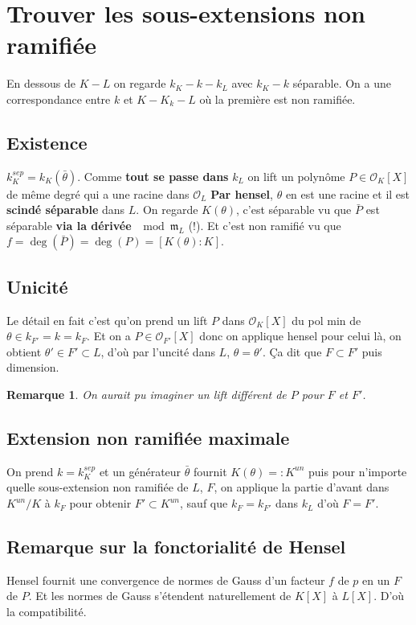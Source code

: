 \documentclass[a4paper,12pt]{book}
\newcommand{\Or}{\mathcal{O}}
\newcommand{\m}{\mathfrak m}
\theoremstyle{plain}
\newtheorem{rem}{Remarque}
\theoremstyle{definition}
\theoremstyle{remark}
\begin{document}
\section{Trouver les sous-extensions non ramifiée}
En dessous de $K-L$ on regarde $k_K-k-k_L$ avec $k_K-k$ séparable.
On a une correspondance entre $k$ et $K-K_k-L$ où la première est
non ramifiée.
\subsection{Existence}
$k_K^{sep}=k_K(\bar\theta)$. Comme \textbf{tout se passe dans} 
$k_L$ on lift un polynôme $P\in\Or_K[X]$ de même degré qui a une
racine dans $\Or_L$ \textbf{Par hensel},
$\theta$ en est une racine et il est \textbf{scindé séparable} dans
$L$. On regarde $K(\theta)$, c'est séparable vu que $\bar P$ est
séparable \textbf{via la dérivée} $\mod \m_L$ (!). Et c'est non
ramifié vu que $f=\deg(\bar P)=\deg(P)=[K(\theta):K]$.
\subsection{Unicité}
Le détail en fait c'est qu'on prend un lift $P$ dans $\Or_K[X]$ du
pol min de $\theta\in k_{F'}=k=k_F$. Et on a $P\in \Or_{F'}[X]$
donc on applique hensel pour celui là, on obtient 
$\theta'\in F'\subset L$, d'où par l'uncité dans $L$, 
$\theta=\theta'$. Ça dit que $F\subset F'$ puis dimension.

\begin{rem}
    On aurait pu imaginer un lift différent de $P$ pour $F$ et
    $F'$.
\end{rem}

\subsection{Extension non ramifiée maximale}
On prend $k=k_K^{sep}$ et un générateur $\bar \theta$ fournit
$K(\theta)=:K^{un}$ puis pour n'importe quelle sous-extension non
ramifiée de $L$, $F$, on applique la partie d'avant dans $K^{un}/K$
à $k_F$ pour obtenir $F'\subset K^{un}$, sauf que $k_F=k_{F'}$
dans $k_L$ d'où $F=F'$.

\subsection{Remarque sur la fonctorialité de Hensel}
Hensel fournit une convergence de normes de Gauss d'un facteur
$f$ de $p$ en un $F$ de $P$. Et les normes de Gauss s'étendent
naturellement de $K[X]$ à $L[X]$. D'où la compatibilité.
\end{document}
